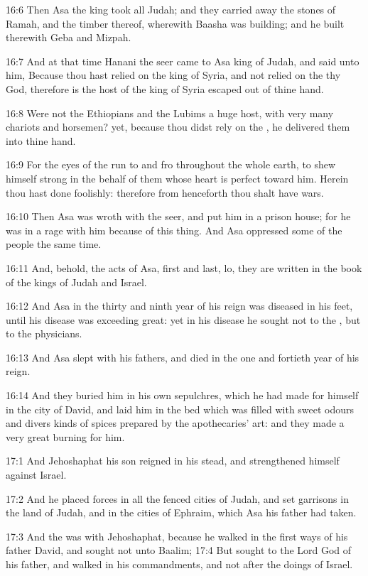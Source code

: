 16:6 Then Asa the king took all Judah; and they carried away the stones of Ramah, and the timber thereof, wherewith Baasha was building; and he built therewith Geba and Mizpah.

16:7 And at that time Hanani the seer came to Asa king of Judah, and said unto him, Because thou hast relied on the king of Syria, and not relied on the \LORD thy God, therefore is the host of the king of Syria escaped out of thine hand.

16:8 Were not the Ethiopians and the Lubims a huge host, with very many chariots and horsemen? yet, because thou didst rely on the \LORD, he delivered them into thine hand.

16:9 For the eyes of the \LORD run to and fro throughout the whole earth, to shew himself strong in the behalf of them whose heart is perfect toward him. Herein thou hast done foolishly: therefore from henceforth thou shalt have wars.

16:10 Then Asa was wroth with the seer, and put him in a prison house; for he was in a rage with him because of this thing. And Asa oppressed some of the people the same time.

16:11 And, behold, the acts of Asa, first and last, lo, they are written in the book of the kings of Judah and Israel.

16:12 And Asa in the thirty and ninth year of his reign was diseased in his feet, until his disease was exceeding great: yet in his disease he sought not to the \LORD, but to the physicians.

16:13 And Asa slept with his fathers, and died in the one and fortieth year of his reign.

16:14 And they buried him in his own sepulchres, which he had made for himself in the city of David, and laid him in the bed which was filled with sweet odours and divers kinds of spices prepared by the apothecaries' art: and they made a very great burning for him.

17:1 And Jehoshaphat his son reigned in his stead, and strengthened himself against Israel.

17:2 And he placed forces in all the fenced cities of Judah, and set garrisons in the land of Judah, and in the cities of Ephraim, which Asa his father had taken.

17:3 And the \LORD was with Jehoshaphat, because he walked in the first ways of his father David, and sought not unto Baalim; 17:4 But sought to the Lord God of his father, and walked in his commandments, and not after the doings of Israel.

